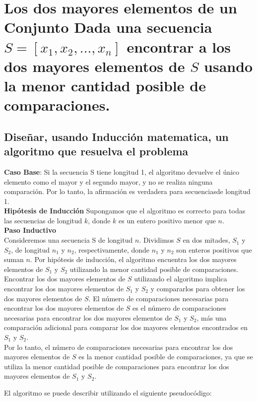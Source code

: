 \section{Los dos mayores elementos de un Conjunto
Dada una secuencia $S= [x_1, x_2, . . . , x_n]$ encontrar a los dos mayores elementos de $S$ usando la menor cantidad posible de comparaciones.}

\subsection{Diseñar, usando Inducción matematica, un algoritmo que resuelva el problema}

\textbf{Caso Base}:  Si la secuencia S tiene longitud 1, el algoritmo devuelve el único elemento como 
el mayor 
y el segundo mayor, y no se realiza ninguna comparación. Por lo tanto, la afirmación es verdadera para 
 secuenciasde longitud 1.\\
\textbf{Hipótesis de Inducción} Supongamos que el algoritmo es correcto para todas las secuencias de 
longitud $k$, donde $k$ es un entero positivo menor que $n$.\\
\textbf{Paso Inductivo}\\
Consideremos una secuencia S de longitud $n$. Dividimos $S$ en dos mitades, $S_1$ y $S_2$, 
de longitud $n_1$ y $n_2$, respectivamente, donde $n_1$ y $n_2$ son enteros positivos que suman $n$. 
Por hipótesis de inducción, el algoritmo encuentra los dos mayores elementos de $S_1$ y $S_2$ utilizando 
la menor cantidad posible de comparaciones.\\

Encontrar los dos mayores elementos de $S$ utilizando el algoritmo implica encontrar los 
dos mayores elementos de $S_1$ y $S_2$ y compararlos para obtener los dos mayores elementos de $S$. 
El número de comparaciones necesarias para encontrar los dos mayores elementos de $S$ es el número de 
comparaciones necesarias para encontrar los dos mayores elementos de $S_1$ y $S_2$, más una comparación 
adicional para comparar los dos mayores elementos encontrados en $S_1$ y $S_2$.\\

Por lo tanto, el número de comparaciones necesarias para encontrar los dos mayores elementos de $S$ 
es la menor cantidad posible de comparaciones, ya que se utiliza la menor cantidad posible de comparaciones 
para encontrar los dos mayores elementos de $S_1$ y $S_2$.

El algoritmo se puede describir utilizando el siguiente pseudocódigo:

